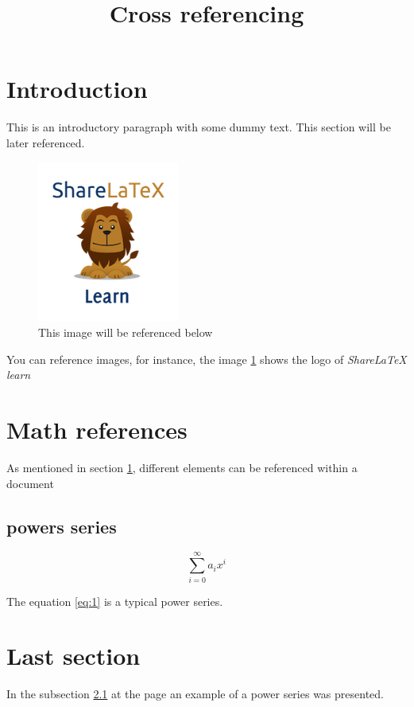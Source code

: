 \documentclass{article}
\title{Cross referencing}
\author{ }
\date{ }
\begin{document}
\maketitle

\section{Introduction} \label{introduction}
This is an introductory paragraph with some dummy text. This section will be later referenced.

\begin{figure}[h]
\centering
\includegraphics[width=0.3\linewidth]{lion-logo.png}
\caption{This image will be referenced below}
\label{fig:lion}
\end{figure}

You can reference images, for instance, the image \ref{fig:lion} shows the logo of \textit{ShareLaTeX learn}

\Blindtext

\section{Math references} \label{mathrefs}
As mentioned in section \ref{introduction}, different elements can be referenced within a document

\subsection{powers series} \label{subsection}

\begin{equation} \label{eq:1}
\sum_{i=0}^{\infty} a_i x^i
\end{equation}

The equation \ref{eq:1} is a typical power series.

\Blindtext

\section{Last section}
In the subsection \ref{subsection} at the page \pageref{eq:1} an example of a power series was presented.
\end{document}
